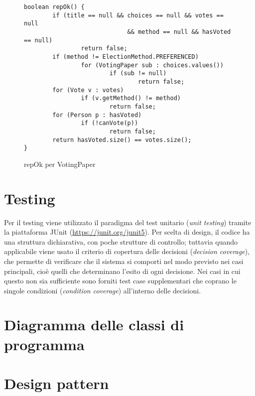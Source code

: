 \begin{figure}
	\centering
	\begin{verbatim}
boolean repOk() {
        if (title == null && choices == null && votes == null
                             && method == null && hasVoted == null)
                return false;
        if (method != ElectionMethod.PREFERENCED)
                for (VotingPaper sub : choices.values())
                        if (sub != null)
                                return false;
        for (Vote v : votes)
                if (v.getMethod() != method)
                        return false;
        for (Person p : hasVoted)
                if (!canVote(p))
                        return false;
        return hasVoted.size() == votes.size();
}
        \end{verbatim}
	\caption{repOk per VotingPaper}\label{repOk-VP}
\end{figure}




\section{Testing}\label{testing}
Per il testing viene utilizzato il paradigma del test unitario (\emph{unit testing}) tramite la piattaforma JUnit (\url{https://junit.org/junit5}). Per scelta di design, il codice ha una struttura dichiarativa, con poche strutture di controllo; tuttavia quando applicabile viene usato il criterio di copertura delle decisioni (\emph{decision coverage}), che permette di verificare che il sistema si comporti nel modo previsto nei casi principali, cioè quelli che determinano l'esito di ogni decisione. Nei casi in cui questo non sia sufficiente sono forniti test case supplementari che coprano le singole condizioni (\emph{condition coverage}) all'interno delle decisioni.




\section{Diagramma delle classi di programma}




\section{Design pattern}\label{pattern}


